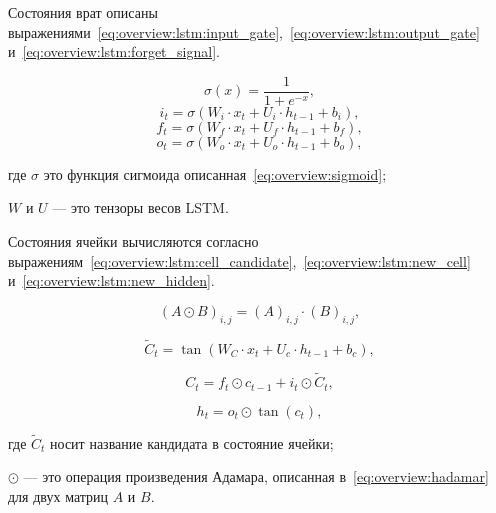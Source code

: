 Состояния врат описаны выражениями~\ref{eq:overview:lstm:input_gate},~\ref{eq:overview:lstm:output_gate} и~\ref{eq:overview:lstm:forget_signal}.

\begin{equation}
  \label{eq:overview:sigmoid}
  \sigma(x) = \frac{1}{1 + e^{-x}},
\end{equation}
\begin{equation}
  \label{eq:overview:lstm:input_gate}
  i_t = \sigma(W_{i}\cdot{x_t} + U_{i}\cdot{h_{t-1}} + b_i),
\end{equation}
\begin{equation}
  \label{eq:overview:lstm:forget_signal}
  f_t = \sigma(W_{f}\cdot{x_t} + U_{f}\cdot{h_{t-1}} + b_f),
\end{equation}
\begin{equation}
  \label{eq:overview:lstm:output_gate}
  o_t = \sigma(W_{o}\cdot{x_t} + U_{o}\cdot{h_{t-1}} + b_o),
\end{equation}
\begin{explanationx}
\item [где] $\sigma$ это функция сигмоида описанная~\ref{eq:overview:sigmoid};
\item $W$ и $U$ --- это тензоры весов LSTM\@.
\end{explanationx}

Состояния ячейки вычисляются согласно выражениям~\ref{eq:overview:lstm:cell_candidate},~\ref{eq:overview:lstm:new_cell} и~\ref{eq:overview:lstm:new_hidden}.

\begin{equation}
  \label{eq:overview:hadamar}
  {(A\odot{B})}_{i,j} = {(A)}_{i,j}\cdot{{(B)}_{i,j}},
\end{equation}

\begin{equation}
  \label{eq:overview:lstm:cell_candidate}
  \tilde{C}_t = \tan(W_{C}\cdot{x_{t}} + U_{c}\cdot{h_{t-1}} + b_c),
\end{equation}

\begin{equation}
  \label{eq:overview:lstm:new_cell}
  C_t = f_t\odot{c_{t-1}} + i_t\odot{\tilde{C}_t},
\end{equation}

\begin{equation}
  \label{eq:overview:lstm:new_hidden}
  h_t = o_t\odot{\tan(c_t)},
\end{equation}
\begin{explanationx}
\item [где] $\tilde{C}_t$ носит название кандидата в состояние ячейки;
\item ${\odot}$ --- это операция произведения Адамара, описанная в~\ref{eq:overview:hadamar} для двух матриц $A$ и $B$.
\end{explanationx}

